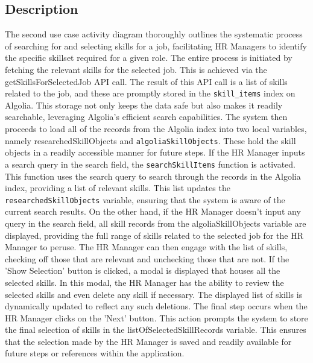 \subsection*{Description}
The second use case activity diagram thoroughly outlines the systematic process of searching for and selecting skills for a job, facilitating HR Managers to identify the specific skillset required for a given role.
The entire process is initiated by fetching the relevant skills for the selected job. This is achieved via the getSkillsForSelectedJob API call. The result of this API call is a list of skills related to the job, and these are promptly stored in the \verb|skill_items| index on Algolia. This storage not only keeps the data safe but also makes it readily searchable, leveraging Algolia's efficient search capabilities.
The system then proceeds to load all of the records from the Algolia index into two local variables, namely researchedSkillObjects and \verb|algoliaSkillObjects|. These hold the skill objects in a readily accessible manner for future steps.
If the HR Manager inputs a search query in the search field, the \verb|searchSkillItems| function is activated. This function uses the search query to search through the records in the Algolia index, providing a list of relevant skills. This list updates the \verb|researchedSkillObjects| variable, ensuring that the system is aware of the current search results. 
On the other hand, if the HR Manager doesn't input any query in the search field, all skill records from the algoliaSkillObjects variable are displayed, providing the full range of skills related to the selected job for the HR Manager to peruse. 
The HR Manager can then engage with the list of skills, checking off those that are relevant and unchecking those that are not. If the 'Show Selection' button is clicked, a modal is displayed that houses all the selected skills. In this modal, the HR Manager has the ability to review the selected skills and even delete any skill if necessary. The displayed list of skills is dynamically updated to reflect any such deletions.
The final step occurs when the HR Manager clicks on the 'Next' button. This action prompts the system to store the final selection of skills in the listOfSelectedSkillRecords variable. This ensures that the selection made by the HR Manager is saved and readily available for future steps or references within the application.



